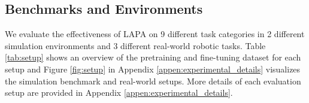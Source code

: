 \documentclass{article} %
\begin{document}
\subsection{Benchmarks and Environments}

We evaluate the effectiveness of LAPA on 9 different task categories in 2 different simulation environments and 3 different real-world robotic tasks. Table \ref{tab:setup} shows an overview of the pretraining and fine-tuning dataset for each setup and Figure \ref{fig:setup} in Appendix \ref{appen:experimental_details} visualizes the simulation benchmark and real-world setups. More details of each evaluation setup are provided in Appendix \ref{appen:experimental_details}.
\end{document}
